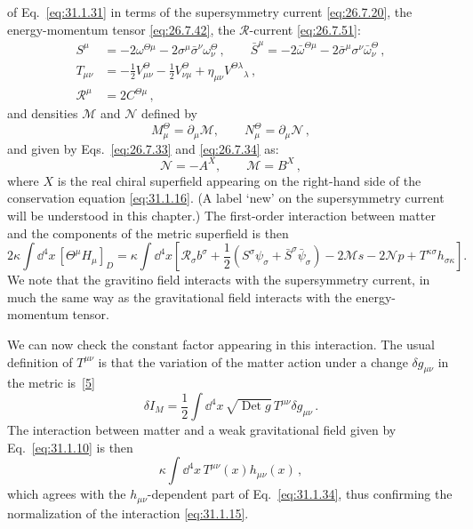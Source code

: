 of Eq.~\eqref{eq:31.1.31} in terms of the supersymmetry current
\eqref{eq:26.7.20}, the energy-momentum tensor \eqref{eq:26.7.42}, the
\(\mathcal{R}\)-current \eqref{eq:26.7.51}:
\[
  \begin{aligned}
  S^\mu
  &=-2\omega^{\Theta\mu}
    -2\sigma^\mu\bar\sigma^\nu\omega_\nu^\Theta\,,
  \qquad
  \bar S^\mu
  =-2\bar\omega^{\Theta\mu}
    -2\bar\sigma^\mu\sigma^\nu\bar\omega_\nu^\Theta\,,
  \\
  T_{\mu\nu}
  &=-\frac12V_{\mu\nu}^\Theta-\frac12V_{\nu\mu}^\Theta
    +\eta_{\mu\nu}V^{\Theta\lambda}{}_\lambda\,,
  \\
  \mathcal{R}^\mu&=2C^{\Theta\mu}\,,
  \end{aligned}
\]
and densities \(\mathcal{M}\) and \(\mathcal{N}\) defined by
\begin{equation}
  M_\mu^\Theta=\partial_\mu\mathcal{M},\qquad
  N_\mu^\Theta=\partial_\mu\mathcal{N}\,,
  \tag{31.1.32}\label{eq:31.1.32}
\end{equation}
and given by Eqs.~\eqref{eq:26.7.33} and \eqref{eq:26.7.34} as:
\begin{equation}
  \mathcal{N}=-A^X,\qquad
  \mathcal{M}=B^X\,,
  \tag{31.1.33}\label{eq:31.1.33}
\end{equation}
where \(X\) is the real chiral superfield appearing on the right-hand side of
the conservation equation \eqref{eq:31.1.16}. (A label `new' on the
supersymmetry current will be understood in this chapter.) The first-order
interaction between matter and the components of the metric superfield is
then
\begin{equation}
  2\kappa\int \dd^4x\,[\Theta^\mu H_\mu]_D
  =\kappa\int \dd^4x
  \left[
    \mathcal{R}_\sigma b^\sigma
    +\frac12\left(
      S^\sigma\psi_\sigma
      +\bar S^\sigma\bar\psi_\sigma\right)
    -2\mathcal{M}s-2\mathcal{N}p
    +T^{\kappa\sigma}h_{\sigma\kappa}
  \right].
  \tag{31.1.34}\label{eq:31.1.34}
\end{equation}
We note that the gravitino field interacts with the supersymmetry current, in
much the same way as the gravitational field interacts with the
energy-momentum tensor.

We can now check the constant factor appearing in this interaction. The usual
definition of \(T^{\mu\nu}\) is that the variation of the matter action under
a change \(\delta g_{\mu\nu}\) in the metric
is~\hyperref[ch31-ref-5]{[5]}
\[
  \delta I_M
  =\frac12\int \dd^4x\,\sqrt{\operatorname{Det}g}\,
    T^{\mu\nu}\delta g_{\mu\nu}\,.
\]
The interaction between matter and a weak gravitational field given by
Eq.~\eqref{eq:31.1.10} is then
\[
  \kappa\int \dd^4x\,T^{\mu\nu}(x)h_{\mu\nu}(x)\,,
\]
which agrees with the \(h_{\mu\nu}\)-dependent part of
Eq.~\eqref{eq:31.1.34}, thus confirming the normalization of the interaction
\eqref{eq:31.1.15}.

